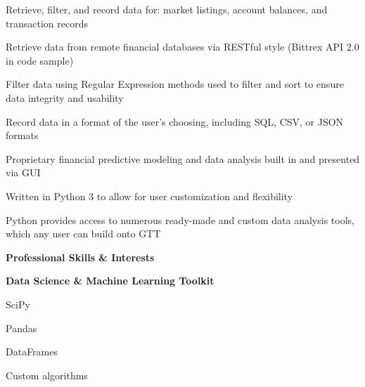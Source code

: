 \documentclass[letterpaper,final]{memoir}
\newcommand{\LargeSep}{\vspace{1.3em}}
\newcommand{\Sep}{\vspace{1.0em}}
\newcommand{\SmallSep}{\vspace{0.4em}}
\newcommand{\CVSection}[1]
	{\LARGE\textbf{#1}\par
	\SmallSep\normalsize}
\newcommand{\CVItem}[1]
	{\textbf{\color{Blue} #1}}
\begin{document}
\begin{compactitem}[\color{Blue}$\circ$]

    \SmallSep
    
    \item Retrieve, filter, and record data for: market listings, account balances, and transaction records
    
    \item Retrieve data from remote financial databases via RESTful style (Bittrex API 2.0 in code sample)
    
    \item Filter data using Regular Expression methods used to filter and sort to ensure data integrity and usability
    
    \item Record data in a format of the user's choosing, including SQL, CSV, or JSON formats
    
    \item Proprietary financial predictive modeling and data analysis built in and presented via GUI
    
    \item Written in Python 3 to allow for user customization and flexibility
    
    \item Python provides access to numerous ready-made and custom data analysis tools, which any user can build onto GTT

\end{compactitem}
\LargeSep


\notoserif \CVSection{Professional Skills \& Interests}
\normalfont

\Sep
\CVItem{Data Science \& Machine Learning Toolkit}
\SmallSep

\begin{multicols}{4}

    \begin{compactitem}[\color{Blue}$\circ$]
		
		\item SciPy
        \SmallSep
        
        \item Pandas
        \SmallSep
        
        \item DataFrames
        \SmallSep
        
        \item Custom algorithms
        
    
	\end{compactitem}

\end{multicols}
\end{document}
